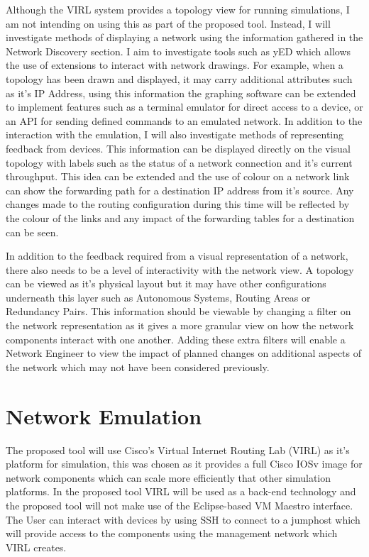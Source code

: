 \documentclass[11pt]{report}
\begin{document}
Although the VIRL system provides a topology view for running simulations, I am not intending on using this as part of the proposed tool. Instead, I will investigate methods of displaying a network using the information gathered in the Network Discovery section. I aim to investigate tools such as yED which allows the use of extensions to interact with network drawings. For example, when a topology has been drawn and displayed, it may carry additional attributes such as it's IP Address, using this information the graphing software can be extended to implement features such as a terminal emulator for direct access to a device, or an API for sending defined commands to an emulated network. In addition to the interaction with the emulation, I will also investigate methods of representing feedback from devices. This information can be displayed directly on the visual topology with labels such as the status of a network connection and it's current throughput. This idea can be extended and the use of colour on a network link can show the forwarding path for a destination IP address from it's source. Any changes made to the routing configuration during this time will be reflected by the colour of the links and any impact of the forwarding tables for a destination can be seen.

In addition to the feedback required from a visual representation of a network, there also needs to be a level of interactivity with the network view. A topology can be viewed as it's physical layout but it may have other configurations underneath this layer such as Autonomous Systems, Routing Areas or Redundancy Pairs. This information should be viewable by changing a filter on the network representation as it gives a more granular view on how the network components interact with one another. Adding these extra filters will enable a Network Engineer to view the impact of planned changes on additional aspects of the network which may not have been considered previously.

\section{Network Emulation}

The proposed tool will use Cisco's Virtual Internet Routing Lab (VIRL) as it's platform for simulation, this was chosen as it provides a full Cisco IOSv image for network components which can scale more efficiently that other simulation platforms. In the proposed tool VIRL will be used as a back-end technology and the proposed tool will not make use of the Eclipse-based VM Maestro interface. The User can interact with devices by using SSH to connect to a jumphost which will provide access to the components using the management network which VIRL creates. 
\end{document}
